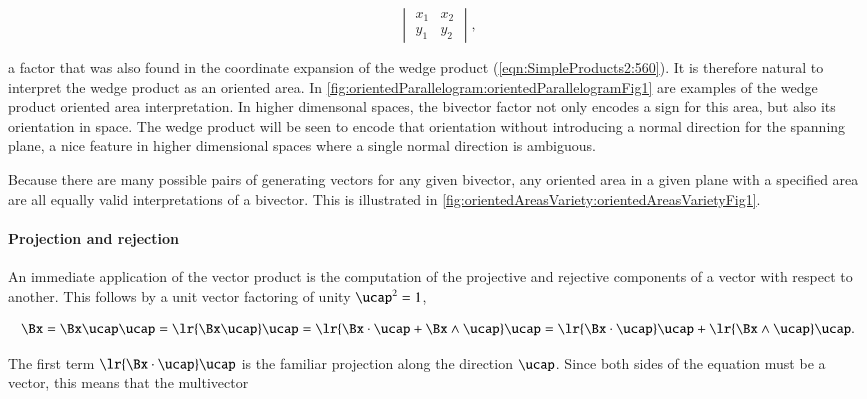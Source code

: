 \begin{dmath}\label{eqn:SimpleProducts2:660}
\begin{vmatrix}
   x_1 & x_2 \\
   y_1 & y_2
\end{vmatrix},
\end{dmath}

a factor that was also found in the coordinate expansion of the wedge product (\cref{eqn:SimpleProducts2:560}).  It is therefore natural to interpret the wedge product as an oriented area.  In \cref{fig:orientedParallelogram:orientedParallelogramFig1} are examples of the wedge product oriented area interpretation.
In higher dimensonal spaces, the bivector factor not only encodes a sign for this area, but also its orientation in space.  The wedge product will be seen to encode that orientation without introducing a normal direction for the spanning plane, a nice feature in higher dimensional spaces where a single normal direction is ambiguous.

Because there are many possible pairs of generating vectors for any given bivector, any oriented area in a given plane with a specified area are all equally valid interpretations of a bivector.  This is illustrated in \cref{fig:orientedAreasVariety:orientedAreasVarietyFig1}.

\paragraph{Projection and rejection}

An immediate application of the vector product is the computation of the projective and rejective components of a vector with respect to another.  This follows by a unit vector factoring of unity \( \ucap^2 = 1 \),

\begin{dmath}\label{eqn:SimpleProducts2:680}
\Bx =
\Bx \ucap \ucap
=
\lr{ \Bx \ucap } \ucap
=
\lr{ \Bx \cdot \ucap + \Bx \wedge \ucap } \ucap
=
\lr{ \Bx \cdot \ucap } \ucap + \lr{ \Bx \wedge \ucap } \ucap.
\end{dmath}

The first term \( \lr{ \Bx \cdot \ucap } \ucap \) is the familiar projection along the direction \( \ucap \).  Since both sides of the equation must be a vector, this means that the multivector

